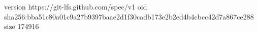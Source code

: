 version https://git-lfs.github.com/spec/v1
oid sha256:bba51c80a01c9a27b9397baae2d1f30cadb173e2b2ed4b4cbcc42d7a867ce288
size 174916

